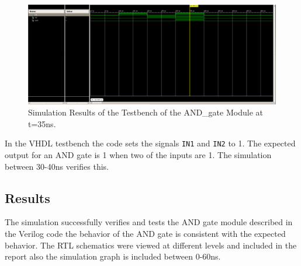 \documentclass{article}
\begin{document}
\begin{figure}[H]
    \centering
    \includegraphics[width=\textwidth]{simat35ns.png}
    \caption{Simulation Results of the Testbench of the AND\_gate Module at t=35ns.}
    \label{fig:sim35}

\end{figure}

In the VHDL testbench the code sets the signals \verb|IN1| and \verb|IN2| to 1. The expected output for an AND gate is 1 when two of the inputs are 1. The simulation between 30-40ns verifies this.


\subsection*{Results}

The simulation successfully verifies and tests the AND gate module described in the Verilog code the behavior of the AND gate is consistent with the expected behavior. The RTL schematics were viewed at different levels and included in the report also the simulation graph is included between 0-60ns.
\end{document}
